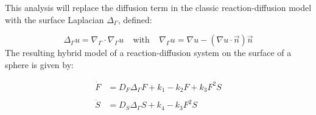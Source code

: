 \documentclass{beamer}
\begin{document}
            \begin{frame}{\insertsubsectionhead}
            
                \vfill
                
                This analysis will replace the diffusion term in the classic reaction-diffusion model with the surface Laplacian $\Delta_\Gamma$, defined:
                \vfill
                
                \begin{equation*}
                    \label{Laplace-Beltrami}
                    \Delta_\Gamma u = \nabla_\Gamma\cdot\nabla_\Gamma u ~~~~~ \text{with} ~~~~~ \nabla_\Gamma u = \nabla u-(\nabla u\cdot\vec{n})\vec{n}
                \end{equation*}
                \vfill
                 The resulting hybrid model of a reaction-diffusion system on the surface of a sphere is given by:
                
                
                \begin{Large}
                \begin{equation*}
                    \begin{aligned}
                    \dot{F} & = D_F\Delta_\Gamma F + k_1 - k_2F + k_3F^2S \\
                    & \\
                    \dot{S} & = D_S\Delta_\Gamma S + k_4 - k_3F^2S \\
                    \end{aligned}
                \end{equation*}
                \end{Large}
            
            \end{frame}
            
\end{document}
